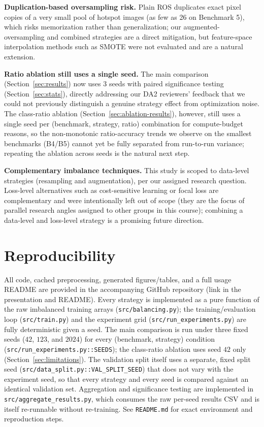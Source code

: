 \documentclass[conference]{IEEEtran}
\begin{document}
\textbf{Duplication-based oversampling risk.} Plain ROS duplicates
exact pixel copies of a very small pool of hotspot images (as few as
26 on Benchmark 5), which risks memorization rather than
generalization; our augmented-oversampling and combined strategies are
a direct mitigation, but feature-space interpolation methods such as
SMOTE \cite{chawla2002smote} were not evaluated and are a natural
extension.

\textbf{Ratio ablation still uses a single seed.} The main comparison
(Section~\ref{sec:results}) now uses 3 seeds with paired significance
testing (Section~\ref{sec:stats}), directly addressing our DA2
reviewers' feedback that we could not previously distinguish a genuine
strategy effect from optimization noise. The class-ratio ablation
(Section~\ref{sec:ablation-results}), however, still uses a single
seed per (benchmark, strategy, ratio) combination for compute-budget
reasons, so the non-monotonic ratio-accuracy trends we observe on the
smallest benchmarks (B4/B5) cannot yet be fully separated from
run-to-run variance; repeating the ablation across seeds is the
natural next step.

\textbf{Complementary imbalance techniques.} This study is scoped to
data-level strategies (resampling and augmentation), per our assigned
research question. Loss-level alternatives such as cost-sensitive
learning \cite{yang2019biased} or focal loss \cite{lin2017focal} are
complementary and were intentionally left out of scope (they are the
focus of parallel research angles assigned to other groups in this
course); combining a data-level and loss-level strategy is a promising
future direction.

\section{Reproducibility}
\label{sec:repro}
All code, cached preprocessing, generated figures/tables, and a full
usage README are provided in the accompanying GitHub repository
(link in the presentation and README). Every strategy is implemented
as a pure function of the raw imbalanced training arrays
(\texttt{src/balancing.py}); the training/evaluation loop
(\texttt{src/train.py}) and the experiment grid
(\texttt{src/run\_experiments.py}) are fully deterministic given a
seed. The main comparison is run under three fixed seeds
($42$, $123$, and $2024$) for every (benchmark, strategy) condition
(\texttt{src/run\_experiments.py::SEEDS}); the class-ratio ablation
uses seed $42$ only (Section~\ref{sec:limitations}). The validation
split itself uses a separate, fixed split seed
(\texttt{src/data\_split.py::VAL\_SPLIT\_SEED}) that does not vary
with the experiment seed, so that every strategy and every seed is
compared against an identical validation set. Aggregation and
significance testing are implemented in
\texttt{src/aggregate\_results.py}, which consumes the raw per-seed
results CSV and is itself re-runnable without re-training. See
\texttt{README.md} for exact environment and reproduction steps.
\end{document}
